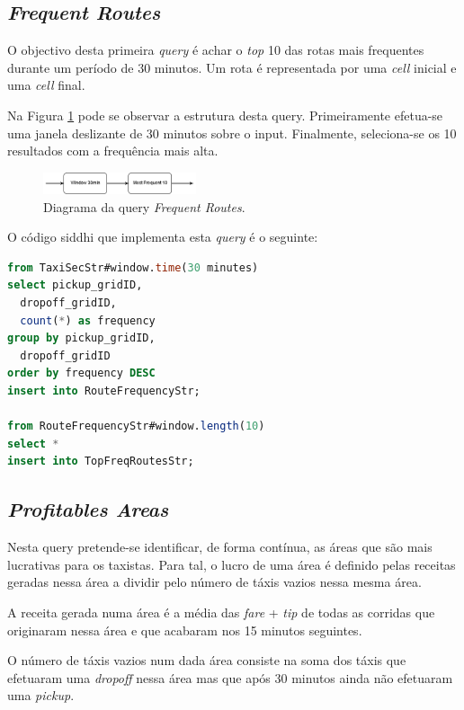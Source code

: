 \documentclass[article]{IEEEtran}
\begin{document}
\subsection{\textit{Frequent Routes}}

O objectivo desta primeira \textit{query} é achar o \textit{top} 10 das rotas mais frequentes durante um período de 30 minutos. Um rota é representada por uma \textit{cell} inicial e uma \textit{cell} final.

Na Figura \ref{fig:frequentRoutesDiagram} pode se observar a estrutura desta query. Primeiramente efetua-se uma janela deslizante de 30 minutos sobre o input. Finalmente, seleciona-se os 10 resultados com a frequência mais alta.

\begin{figure}[hbtp]
    \centering
        \includegraphics[width=0.4\textwidth]{images/frequentRoutesDiagram}
    \caption{Diagrama da query \textit{Frequent Routes}.}
    \label{fig:frequentRoutesDiagram}
\end{figure}

O código siddhi que implementa esta \textit{query} é o seguinte:

\begin{lstlisting}[language=SQL]
from TaxiSecStr#window.time(30 minutes)
select pickup_gridID,
  dropoff_gridID,
  count(*) as frequency
group by pickup_gridID,
  dropoff_gridID
order by frequency DESC
insert into RouteFrequencyStr;

from RouteFrequencyStr#window.length(10)
select *
insert into TopFreqRoutesStr;
\end{lstlisting}

\subsection{\textit{Profitables Areas}}

Nesta query pretende-se identificar, de forma contínua, as áreas que são mais lucrativas para os taxistas. Para tal, o lucro de uma área é definido pelas receitas geradas nessa área a dividir pelo número de táxis vazios nessa mesma área.

A receita gerada numa área é a média das \textit{fare} + \textit{tip} de todas as corridas que originaram nessa área e que acabaram nos 15 minutos seguintes.

O número de táxis vazios num dada área consiste na soma dos táxis que efetuaram uma \textit{dropoff} nessa área mas que após 30 minutos ainda não efetuaram uma \textit{pickup}.
\end{document}
